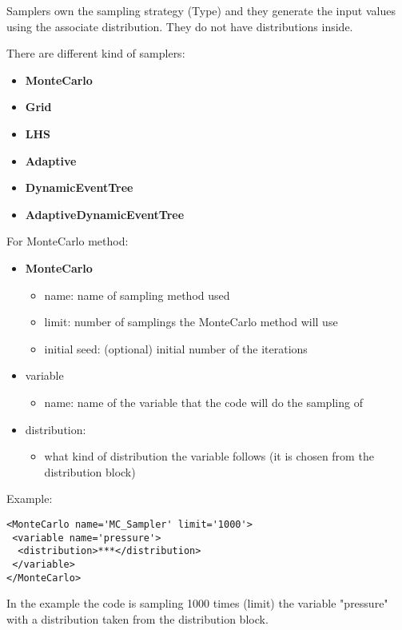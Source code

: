 Samplers own the sampling strategy (Type) and they generate the input values using the associate distribution. They do not have distributions inside.

There are different kind of samplers:
\begin{itemize}
\item \textbf{MonteCarlo}
\item \textbf{Grid}
\item \textbf{LHS}
\item \textbf{Adaptive}
\item \textbf{DynamicEventTree}
\item \textbf{AdaptiveDynamicEventTree}
\end{itemize}

For MonteCarlo method: 
\begin{itemize}
\item \textbf{MonteCarlo}
\begin{itemize}
\item name: name of sampling method used
\item limit: number of samplings the MonteCarlo method will use
\item initial seed: (optional) initial number of the iterations
\end{itemize}
\item variable 
\begin{itemize}
\item name: name of the variable that the code will do the sampling of
\end{itemize}
\item distribution: 
\begin{itemize}
\item what kind of distribution the variable follows (it is chosen from the distribution block)
\end{itemize}
\end{itemize}

Example:

\begin{lstlisting}[style=XML]
<MonteCarlo name='MC_Sampler' limit='1000'> 
 <variable name='pressure'> 
  <distribution>***</distribution> 	
 </variable> 
</MonteCarlo> 
\end{lstlisting}
In the example the code is sampling 1000 times (limit) the variable "pressure" with a distribution taken from the distribution block.

